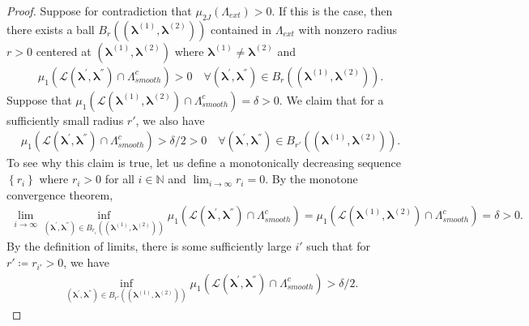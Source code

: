 \documentclass[10pt]{book}
\theoremstyle{definition}
\begin{document}
\begin{proof}
	Suppose for contradiction that $\mu_{2J}(\Lambda_{ext})>0$.
	If this is the case, then there exists a ball $B_{r}\left(\left(\boldsymbol{\lambda}^{(1)},\boldsymbol{\lambda}^{(2)}\right)\right)$ contained in $\Lambda_{ext}$ with nonzero radius $r>0$ centered at $\left(\boldsymbol{\lambda}^{(1)},\boldsymbol{\lambda}^{(2)}\right)$
	where $\boldsymbol{\lambda}^{(1)} \ne \boldsymbol{\lambda}^{(2)}$ and
	\begin{align}
	\mu_{1}\left(\mathcal{L}\left(\boldsymbol{\lambda}^{'},\boldsymbol{\lambda}^{''}\right)\cap\Lambda_{smooth}^{c}\right) >0
	\quad \forall\left(\boldsymbol{\lambda}^{'},\boldsymbol{\lambda}^{''}\right)\in B_{r}\left(\left(\boldsymbol{\lambda}^{(1)},\boldsymbol{\lambda}^{(2)}\right)\right).
	\end{align}
	Suppose that $\mu_{1}\left(\mathcal{L}\left(\boldsymbol{\lambda}^{(1)},\boldsymbol{\lambda}^{(2)}\right)\cap\Lambda_{smooth}^{c}\right)=\delta>0$.
	We claim that for a sufficiently small radius $r'$, we also have
	\begin{align}
	\mu_{1}\left(\mathcal{L}\left(\boldsymbol{\lambda}^{'},\boldsymbol{\lambda}^{''}\right)\cap\Lambda_{smooth}^{c}\right)>\delta/2>0
	\quad \forall
	\left(\boldsymbol{\lambda}^{'},\boldsymbol{\lambda}^{''}\right)
	\in B_{r'}\left(\left(\boldsymbol{\lambda}^{(1)},\boldsymbol{\lambda}^{(2)}\right)\right).
	\end{align}
	To see why this claim is true, let us define a monotonically decreasing
	sequence $\left\{ r_{i}\right\} $ where $r_{i} > 0$ for all $i \in \mathbb{N}$ and $\lim_{i\rightarrow\infty}r_{i}=0$.
	By the monotone convergence theorem,
	\begin{align}
	\lim_{i\rightarrow\infty}\inf_{\left(\boldsymbol{\lambda}^{'},\boldsymbol{\lambda}^{''}\right)\in B_{r_{i}}\left(\left(\boldsymbol{\lambda}^{(1)},\boldsymbol{\lambda}^{(2)}\right)\right)}\mu_{1}\left(\mathcal{L}\left(\boldsymbol{\lambda}^{'},\boldsymbol{\lambda}^{''}\right)\cap\Lambda_{smooth}^{c}\right)=\mu_{1}\left(\mathcal{L}\left(\boldsymbol{\lambda}^{(1)},\boldsymbol{\lambda}^{(2)}\right)\cap\Lambda_{smooth}^{c}\right)=\delta>0.
	\end{align}
	By the definition of limits, there is some sufficiently
	large $i'$ such that for $r'\coloneqq r_{i'} > 0$, we have
	\begin{align}
	\inf_{\left(\boldsymbol{\lambda}^{'},\boldsymbol{\lambda}^{''}\right)\in B_{r'}\left(\left(\boldsymbol{\lambda}^{(1)},\boldsymbol{\lambda}^{(2)}\right)\right)}\mu_{1}\left(\mathcal{L}\left(\boldsymbol{\lambda}^{'},\boldsymbol{\lambda}^{''}\right)\cap\Lambda_{smooth}^{c}\right)>\delta/2.

\end{align}
\end{proof}
\end{document}
